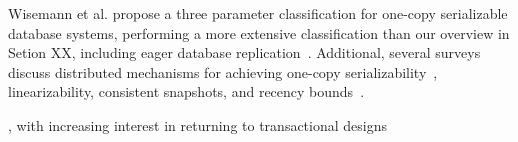 Wisemann et al. propose a three parameter classification for one-copy
serializable database systems, performing a more extensive
classification than our overview in Setion XX, including eager
database replication~\cite{kemme-classification}. Additional, several
surveys discuss distributed mechanisms for achieving one-copy
serializability~\cite{wisemann-survey}, linearizability, consistent
snapshots, and recency bounds~\cite{ceri-mechanism, chen-mechanism}.




, with increasing interest in returning to transactional
designs~\cite{spanner, walter, foundation-article, krikellas-bargain,
  eiger}

